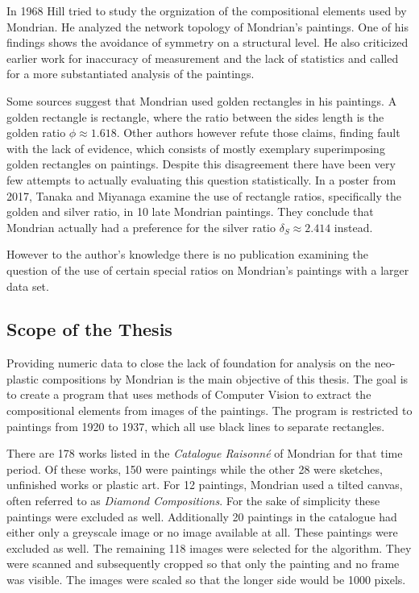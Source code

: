 \documentclass[serif,article,noparskip]{agse-thesis}
\begin{document}
In 1968 Hill \cite{Hill1968} tried to study the orgnization of the compositional
elements used by Mondrian. He analyzed the network topology of Mondrian's
paintings. One of his findings shows the avoidance of symmetry on a structural
level. He also criticized earlier work for inaccuracy of measurement and the
lack of statistics and called for a more substantiated analysis of the
paintings.

Some sources \cite{bouleau1963,bergamini1980} suggest that Mondrian used golden
rectangles in his paintings. A golden rectangle is rectangle, where the ratio
between the sides length is the golden ratio $\phi \approx 1.618$. Other authors
however \cite{Livio2002,Markowsky1992} refute those claims, finding fault with
the lack of evidence, which consists of mostly exemplary superimposing golden
rectangles on paintings. Despite this disagreement there have been very few
attempts to actually evaluating this question statistically. In a poster from
2017, Tanaka and Miyanaga \cite{Tanaka2017} examine the use of rectangle ratios,
specifically the golden and silver ratio, in 10 late Mondrian paintings. They
conclude that Mondrian actually had a preference for the silver ratio $\delta_S
\approx 2.414$ instead.

However to the author's knowledge there is no publication examining the question of
the use of certain special ratios on Mondrian's paintings with a larger data
set.

\subsection{Scope of the Thesis}

Providing numeric data to close the lack of foundation for analysis on the
neo-plastic compositions by Mondrian is the main objective of this thesis. The
goal is to create a program that uses methods of Computer Vision to extract the
compositional elements from images of the paintings. The program is restricted
to paintings from 1920 to 1937, which all use black lines to separate rectangles.

There are 178 works listed in the \textit{Catalogue Raisonn{\'e}}
\cite{joosten1998} of Mondrian for that time period. Of these works, 150 were
paintings while the other 28 were sketches, unfinished works or plastic art. For
12 paintings, Mondrian used a tilted canvas, often referred to as
\textit{Diamond Compositions}. For the sake of simplicity these paintings were
excluded as well. Additionally 20 paintings in the catalogue had either only a
greyscale image or no image available at all. These paintings were excluded as
well. The remaining 118 images were selected for the algorithm. They were
scanned and subsequently cropped so that only the painting and no frame was
visible. The images were scaled so that the longer side would be 1000 pixels.
\end{document}
